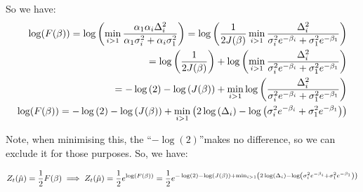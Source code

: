 So we have:
\begin{align}
\log(F(\beta)) =\log\left(\min_{i>1}\frac{\alpha_1 \alpha_i \Delta_{i}^2}{\alpha_1 \sigma_i^2 + \alpha_i \sigma_1^2}\right)
=\log\left(\frac{1}{2J(\beta)}\min_{i>1}   \frac{\Delta_i^2}{\sigma_i^2e^{-\beta_i} +\sigma_1^2 e^{-\beta_1} }\right) \\
=\log\left(\frac{1}{2J(\beta)}\right) + \log\left(\min_{i>1} \frac{\Delta_i^2}{\sigma_i^2e^{-\beta_i} +\sigma_1^2 e^{-\beta_1} }\right) \\
=-\log\left(2\right) -\log\left(J(\beta)\right) + \min_{i>1} \log\left(\frac{\Delta_i^2}{\sigma_i^2e^{-\beta_i} +\sigma_1^2 e^{-\beta_1} }\right) \\
\log(F(\beta))=-\log\left(2\right) -\log\left(J(\beta)\right) + \min_{i>1} \left(2\log\left(\Delta_i\right) -\log\left({\sigma_i^2e^{-\beta_i} +\sigma_1^2 e^{-\beta_1} }\right)\right)
\end{align}

Note, when minimising this, the \textquotedblleft$-\log\left(2\right)$\textquotedblright\space makes no difference, so we can exclude it for those purposes. So, we have:

\begin{align}
Z_{t}(\hat{\mu}) = \frac{1}{2}F(\beta)
\implies Z_{t}(\hat{\mu}) = \frac{1}{2}e^{\log(F(\beta)) }
= \frac{1}{2}e^{-\log\left(2\right) -\log\left(J(\beta)\right) + \min_{i>1} \left(2\log\left(\Delta_i\right) -\log\left({\sigma_i^2e^{-\beta_i} +\sigma_1^2 e^{-\beta_1} }\right)\right)}
\end{align}


